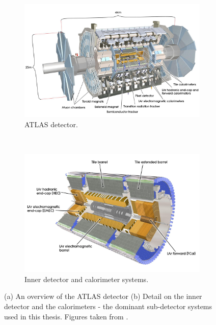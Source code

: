 \begin{figure}[p]
  \centering
  \begin{subfigure}[b]{0.9\textwidth}
    \includegraphics[width=\textwidth]{Chapter2/ATLAS.png}
    \caption{ATLAS detector.}
    \label{fig:ATLASfull}
  \end{subfigure}
  ~
  \begin{subfigure}[b]{0.9\textwidth}
    \includegraphics[width=\textwidth]{Chapter2/ATLASinner.jpeg}
    \caption{Inner detector and calorimeter systems.}
    \label{fig:ATLASinner}
  \end{subfigure}
  \caption[(a) An overview of the ATLAS detector 
           (b) Detail on the inner detector and the calorimeters - the dominant
           sub-detector systems used in this thesis.]
           {(a) An overview of the ATLAS detector 
           (b) Detail on the inner detector and the calorimeters - the dominant
           sub-detector systems used in this thesis. Figures taken from
           \cite{CERNbook}.}
  \label{fig:ATLAS}
\end{figure}

